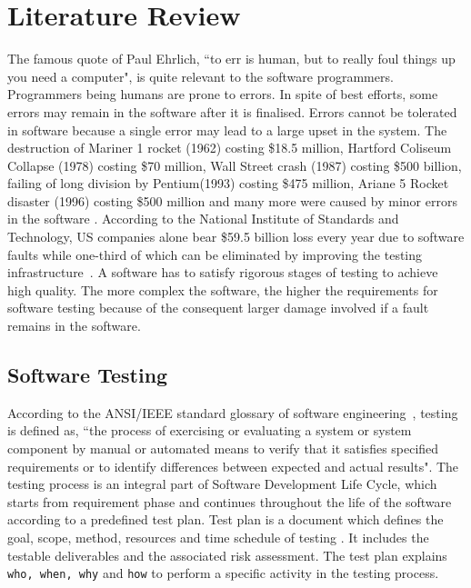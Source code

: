 
\chapter{Literature Review}
\label{chap:softwareTesting}

The famous quote of Paul Ehrlich, ``to err is human, but to really foul things up you need a computer", is quite relevant to the software programmers. Programmers being humans are prone to errors. In spite of best efforts, some errors may remain in the software after it is finalised.  Errors cannot be tolerated in software because a single error may lead to a large upset in the system. The destruction of Mariner 1 rocket (1962) costing \$18.5 million, Hartford Coliseum Collapse (1978) costing \$70 million, Wall Street crash (1987) costing \$500 billion, failing of long division by Pentium\texttrademark (1993) costing \$475 million, Ariane 5 Rocket disaster (1996) costing \$500 million and many more were caused by minor errors in the software \cite{garfinkel2005history}. According to the National Institute of Standards and Technology, US companies alone bear \$59.5 billion loss every year due to software faults while one-third of which can be eliminated by improving the testing infrastructure~\cite{tassey2002economic}. A software has to satisfy rigorous stages of testing to achieve high quality. The more complex the software, the higher the requirements for software testing because of the consequent larger damage involved if a fault remains in the software.

\section{Software Testing} \label{sec:softwareTesting}
According to the ANSI/IEEE standard glossary of software engineering~\cite{american1984}, testing is defined as, ``the process of exercising or evaluating a system or system component by manual or automated means to verify that it satisfies specified requirements or to identify differences between expected and actual results". The testing process is an integral part of Software Development Life Cycle, which starts from requirement phase and continues throughout the life of the software according to a predefined test plan. Test plan is a document which defines the goal, scope, method, resources and time schedule of testing \cite{futrell2001quality}. It includes the testable deliverables and the associated risk assessment. The test plan explains \verb+who, when, why+ and \verb+how+ to perform a specific activity in the testing process. 

